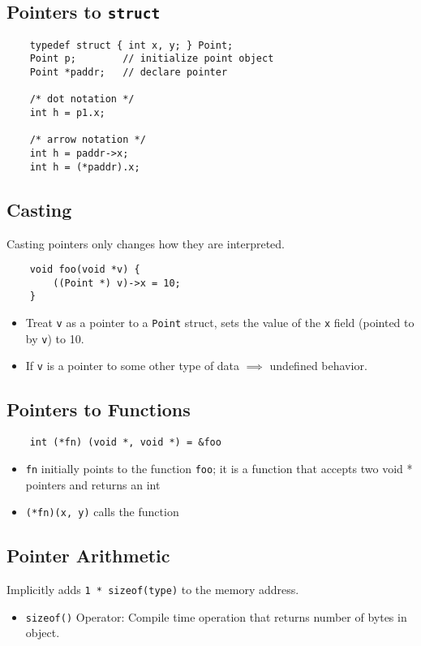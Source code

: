 \subsection{Pointers to \texttt{struct}}
\begin{verbatim}
    typedef struct { int x, y; } Point;
    Point p;        // initialize point object
    Point *paddr;   // declare pointer
    
    /* dot notation */
    int h = p1.x;
    
    /* arrow notation */
    int h = paddr->x;
    int h = (*paddr).x;
\end{verbatim}

\subsection{Casting}
Casting pointers only changes how they are interpreted.
\begin{verbatim}
    void foo(void *v) {
        ((Point *) v)->x = 10;
    }
\end{verbatim}

\begin{itemize}
    \item Treat \texttt{v} as a pointer to a \texttt{Point} struct, sets the value of the \texttt{x} field (pointed to by \texttt{v}) to 10.
    \item If \texttt{v} is a pointer to some other type of data \(\implies\) undefined behavior.
\end{itemize}

\subsection{Pointers to Functions}
\begin{verbatim}
    int (*fn) (void *, void *) = &foo
\end{verbatim}

\begin{itemize}
    \item \texttt{fn} initially points to the function \texttt{foo}; it is a function that accepts two void * pointers and returns an int
    \item \texttt{(*fn)(x, y)} calls the function
\end{itemize}

\subsection{Pointer Arithmetic}
Implicitly adds \texttt{1 * sizeof(type)} to the memory address.
\begin{itemize}
    \item \texttt{sizeof()} Operator: Compile time operation that returns number of bytes in object.
\end{itemize}

